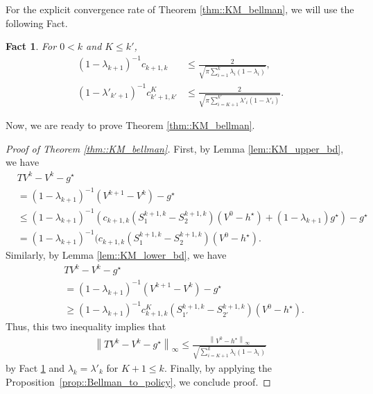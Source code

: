 \documentclass{article} %
\newcommand{\cP}{\mathcal{P}}
\newcommand*{\infn}[1]{\left\|{#1}\right\|_{\infty}}
\newtheorem{fact}{Fact}
\begin{document}
For the explicit convergence rate of Theorem  \ref{thm::KM_bellman}, we will use the following Fact. 
\begin{fact}\label{fact::coeff}
For $0 < k$ and $K \le k'$,
    \begin{align*}
        (1-\lambda_{k+1})^{-1}c_{k+1,k} &\le  \frac{2}{\sqrt{\pi\sum^{k}_{i=1} \lambda_i(1-\lambda_{i})}},
        \\ (1-\lambda'_{k'+1})^{-1}c^K_{k'+1,k'} &\le  \frac{2}{\sqrt{\pi\sum^{k'}_{i=K+1} \lambda'_i(1-\lambda'_{i})}}.
    \end{align*} 
\end{fact}
Now, we are ready to prove Theorem \ref{thm::KM_bellman}.
\begin{proof}[Proof of Theorem \ref{thm::KM_bellman}]
    First, by Lemma \ref{lem::KM_upper_bd}, we have 
    \begin{align*}
        &TV^k-V^k-g^{\star} 
        \\&= (1-\lambda_{k+1})^{-1}(V^{k+1}-V^k)-g^{\star} 
        \\& \le  (1-\lambda_{k+1})^{-1}(c_{k+1,k}(S^{k+1,k}_1-S^{k+1,k}_2) (V^0-h^{\star})+(1-\lambda_{k+1})g^{\star})-g^{\star}
        \\& =  (1-\lambda_{k+1})^{-1}(c_{k+1,k}(S^{k+1,k}_1-S^{k+1,k}_2) (V^0-h^{\star}).
    \end{align*}
Similarly, by Lemma \ref{lem::KM_lower_bd}, we have 
    \begin{align*}
        &TV^k-V^k-g^{\star} 
        \\&= (1-\lambda_{k+1})^{-1}(V^{k+1}-V^k)-g^{\star}  
        \\&\ge  (1-\lambda_{k+1})^{-1}c^K_{k+1,k}(S^{k+1,k}_{1'}-S^{k+1,k}_{2'}) (V^0-h^{\star}).
    \end{align*}
Thus, this two inequality implies that
    \begin{align*}
        \infn{TV^k-V^k-g^{\star}} \le \frac{\infn{V^0-h^{\star}}}{\sqrt{\sum^{k}_{i=K+1} \lambda_i(1-\lambda_{i})}}
    \end{align*}
    by Fact \ref{fact::coeff} and $\lambda_k = \lambda'_k$ for $K+1 \le k$. Finally, by applying the Proposition~\ref{prop::Bellman_to_policy}, we conclude proof.
\end{proof}
\end{document}
